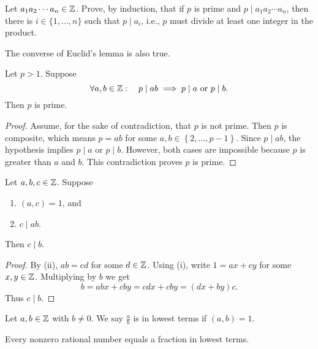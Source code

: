 \documentclass[11pt,a4paper]{article}
\begin{document}
\begin{eje}
    Let \(a_1 a_2 \cdots a_n\in \mathbb{Z}\).
    Prove, by induction, that if \(p\) is prime and \(p\mid a_1 a_2 \cdots a_n\), then there is \(i\in \{1,\ldots,n\}\) such that \(p\mid a_i\), i.e., \(p\) must divide at least one integer in the product.
\end{eje}

The converse of Euclid's lemma is also true.

\begin{prop}
    Let \(p>1\).
    Suppose
    \[\forall a,b\in \mathbb{Z}  :\quad p\mid ab\implies p\mid a \text{  or  } p\mid b.\]
    Then \(p\) is prime.
\end{prop}

\begin{proof}
    Assume, for the sake of contradiction, that \(p\) is not prime.
    Then \(p\) is composite, which means \(p=ab\) for some \(a,b\in \left\{ 2,\ldots, p-1 \right\}\).
    Since \(p\mid ab\), the hypothesis implies \(p\mid a\) or \(p\mid b\).
    However, both cases are impossible because \(p\) is greater than \(a\) and \(b\).
    This contradiction proves \(p\) is prime.
\end{proof}


\begin{prop}
    Let \(a,b,c\in \mathbb{Z}\).
    Suppose
    \begin{enumerate}[label=(\roman*)]
        \item \((a,c) = 1\), and
        \item \(c\mid ab\).
    \end{enumerate}
    Then \(c\mid b\).
\end{prop}


\begin{proof}
    By (ii), \(ab=cd\) for some \(d\in\mathbb{Z}\).
    Using (i), write \(1 = ax+cy\) for some \(x,y\in \mathbb{Z}\). Multiplying by \(b\) we get 
    \[b = abx + cby = cdx + cby = (dx + by)c.\]
    Thus \(c\mid b\).
\end{proof}



\begin{defi}
    Let \(a,b\in \mathbb{Z}\) with \(b\neq 0\). We say \(\frac{a}{b}    \) is in lowest terms if \((a,b) = 1\).
\end{defi}

\begin{lem}
    Every nonzero rational number equals a fraction in lowest terms.
\end{lem}
\end{document}

